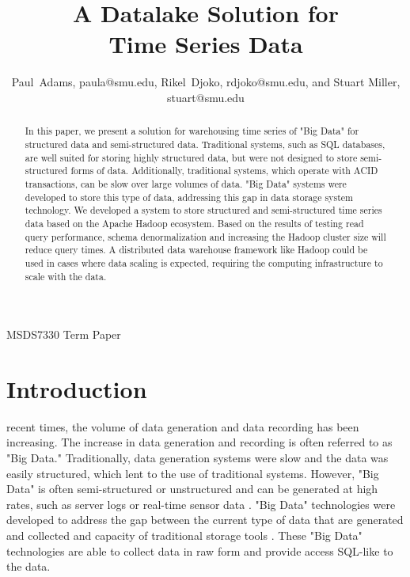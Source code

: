 \documentclass[journal]{IEEEtran}
\begin{document}
\title{A Datalake Solution for\\ 
       Time Series Data}

\author{Paul~Adams, paula@smu.edu,
        Rikel~Djoko, rdjoko@smu.edu,
        and Stuart Miller, stuart@smu.edu}

{MSDS7330 Term Paper}

\maketitle

\begin{abstract}

In this paper, we present a solution for warehousing time series of "Big Data"
 for structured data and semi-structured data.
Traditional systems, such as SQL databases, are well suited for storing highly structured data,
 but were not designed to store semi-structured forms of data.
Additionally, traditional systems, which operate with ACID transactions,
 can be slow over large volumes of data.
"Big Data" systems were developed to store this type of data,
 addressing this gap in data storage system technology.
We developed a system to store structured and semi-structured time series data based on the 
 Apache Hadoop ecosystem.
Based on the results of testing read query performance,
 schema denormalization and increasing the Hadoop cluster size will reduce query times.
A distributed data warehouse framework like Hadoop could be used in cases where data scaling is expected,
 requiring the computing infrastructure to scale with the data.

\end{abstract}

\section{Introduction}


 recent times, the volume of data generation and
 data recording has been increasing.
The increase in data generation and recording is often referred to as "Big Data."
Traditionally, data generation systems were slow and the data was easily structured, 
 which lent to the use of traditional systems.
However, "Big Data" is often semi-structured or unstructured and
 can be generated at high rates,
  such as server logs or real-time sensor data \cite{Intel}.
"Big Data" technologies were developed to address the gap between the current type of data
 that are generated and collected and capacity of traditional storage tools \cite{BigDataComputing}.
These "Big Data" technologies are able to collect data in raw form and
 provide access SQL-like to the data.
\end{document}
